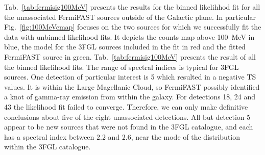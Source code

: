 \documentclass[useAMS,usenatbib]{mn2e}
\begin{document}
Tab.~\ref{tab:fermisig100MeV} presents the results for the binned
likelihhod fit for all the unassociated FermiFAST sources outside of
the Galactic plane.  In particular Fig.~\ref{fig:100MeVcmap} focuses
on the two sources for which we successfully fit the data with
unbinned likelihood fits.  It depicts the counts map above 100~MeV in
blue, the model for the 3FGL sources included in the fit in red and
the fitted FermiFAST source in green.  Tab.~\ref{tab:fermisig100MeV}
presents the result of all the binned likelihood fits.  The range of
spectral indices is typical for 3FGL sources. One detection of
particular interest is 5 which resulted in a negative TS values.  It
is within the Large Magellanic Cloud, so FermiFAST possibly identified
a knot of gamma-ray emission from within the galaxy.  For detections
18, 24 and 43 the likelihood fit failed to converge.  Therefore, we
can only make definitive conclusions about five of the eight
unassociated detections.  All but detection 5 appear to be new sources
that were not found in the 3FGL catalogue, and each has a spectral index between
$2.2$ and $2.6$, near the mode of the distribution within the 3FGL catalogue.
\end{document}
